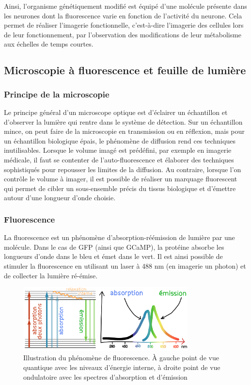 Ainsi, l'organisme génétiquement modifié est équipé d'une molécule présente dans les neurones dont la fluorescence varie en fonction de l'activité du neurone. Cela permet de réaliser l'imagerie fonctionnelle, c'est-à-dire l'imagerie des cellules lors de leur fonctionnement, par l'observation des modifications de leur métabolisme aux échelles de temps courtes. 

\subsection{Microscopie à fluorescence et feuille de lumière}

\subsubsection{Principe de la microscopie}

Le principe général d'un microscope optique est d'éclairer un échantillon et d'observer la lumière qui rentre dans le système de détection. Sur un échantillon mince, on peut faire de la microscopie en transmission ou en réflexion, mais pour un échantillon biologique épais, le phénomène de diffusion rend ces techniques inutilisables. Lorsque le volume imagé est prédéfini, par exemple en imagerie médicale, il faut se contenter de l'auto-fluorescence et élaborer des techniques sophistiqués pour repousser les limites de la diffusion. Au contraire, lorsque l'on contrôle le volume à imager, il est possible de réaliser un marquage fluorescent qui permet de cibler un sous-ensemble précis du tissus biologique et d'émettre autour d'une longueur d'onde choisie.

\subsubsection{Fluorescence}

La fluorescence est un phénomène d’absorption-réémission de lumière par une molécule. Dans le cas de GFP (ainsi que GCaMP), la protéine absorbe les longueurs d'onde dans le bleu et émet dans le vert. Il est ainsi possible de stimuler la fluorescence en utilisant un laser à 488 nm (en imagerie un photon) et de collecter la lumière ré-émise. 

\begin{figure}
\centering
\includegraphics[width=0.8\textwidth]{./files/fluo_couleur.svg.png}
\caption{Illustration du phénomène de fluorescence. À gauche point de vue quantique avec les niveaux d'énergie interne, à droite point de vue ondulatoire avec les spectres d’absorption et d'émission}
\end{figure}

